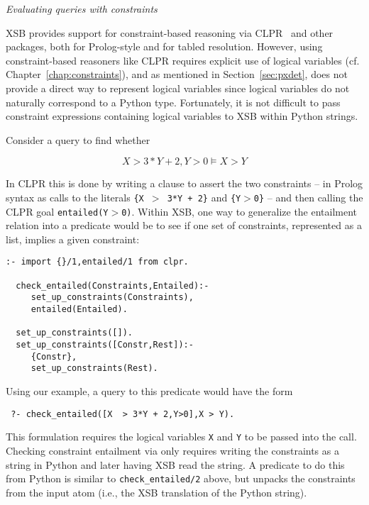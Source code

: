 \begin{example} \rm {\it Evaluating queries with constraints} \label{ex:connstraints}

  XSB provides support for constraint-based reasoning via
  CLPR~\cite{Holz95} and other packages, both for Prolog-style and for
  tabled resolution.  However, using constraint-based reasoners like
  CLPR requires explicit use of logical variables
  (cf. Chapter~\ref{chap:constraints}), and as mentioned in
  Section~\ref{sec:pxdet}, \px{} does not provide a direct way to
  represent logical variables since logical variables do not naturally
  correspond to a Python type.  Fortunately, it is not difficult to
  pass constraint expressions containing logical variables to XSB
  within Python strings.

  Consider a query to find whether 

  \[X  > 3*Y + 2,Y>0 \models X > Y\]

\noindent  
  In CLPR this is done by writing a clause to assert the two
  constraints -- in Prolog syntax as calls to the literals {\tt \{X
    $>$ 3*Y + 2\}} and {\tt \{Y$>$0\}} -- and then calling the CLPR
  goal {\tt entailed(Y$>$0)}.  Within XSB, one way to generalize the
  entailment relation into a predicate would be to see if one set of
  constraints, represented as a list, implies a given constraint:

{\small  
\begin{verbatim}  
:- import {}/1,entailed/1 from clpr.

  check_entailed(Constraints,Entailed):- 
     set_up_constraints(Constraints),
     entailed(Entailed).

  set_up_constraints([]).
  set_up_constraints([Constr,Rest]):- 
     {Constr},
     set_up_constraints(Rest).
\end{verbatim}
}
\noindent
Using our example, a query to this predicate would have the form

\begin{verbatim}
 ?- check_entailed([X  > 3*Y + 2,Y>0],X > Y).
\end{verbatim}
\noindent
This formulation requires the logical variables {\tt X} and {\tt Y} to
be passed into the call.  Checking constraint entailment via \px{}
only requires writing the constraints as a string in Python and later
having XSB read the string.  A predicate to do this from Python is
similar to {\tt check\_entailed/2} above, but unpacks the constraints
from the input atom (i.e., the XSB translation of the Python string).


\end{example}
